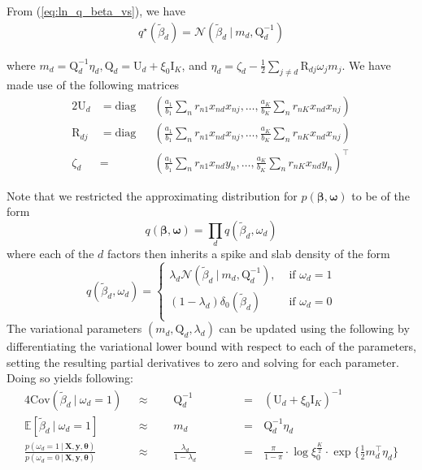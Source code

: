 \documentclass[twoside,11pt]{article}
\newcommand\given[1][]{\:#1\vert\:}
\newcommand{\transpose}[1]{#1^{\intercal}}
\newcommand{\nsum}{\sum\limits_{n}}
\newcommand{\boldbeta}{\boldsymbol\beta}
\newcommand{\E}{\mathbb{E}}
\newcommand{\betad}{\tilde{\beta}_d}
\newcommand{\umat}{\mathrm{U}}
\newcommand{\qmat}{\mathrm{Q}}
\newcommand{\pr}[1]{p \left( #1 \right)}
\begin{document}
From (\ref{eq:ln_q_beta_vs}), we have
\begin{align*}
	q^{\star}(\betad) = \mathcal{N} \left( \betad \given m_d, \qmat_d^{-1} \right)
\end{align*}

where $m_d = \qmat_d^{-1} \eta_d, \qmat_d = \umat_d + \xi_0 \mathrm{I}_K$, and $\eta_d = \zeta_d - \frac{1}{2} \sum\limits_{j \neq d} \mathrm{R}_{dj} \omega_j m_j$. We have made use of the following matrices
\begin{alignat}{2}
	\umat_d &= \mathrm{diag} &&\left(\frac{a_1}{b_1} \nsum r_{n1} x_{nd}x_{nj}, \ldots, \frac{a_K}{b_K} \nsum r_{nK} x_{nd}x_{nj} \right) \\
	\mathrm{R}_{dj} &= \mathrm{diag} &&\left(\frac{a_1}{b_1} \nsum r_{n1} x_{nd}x_{nj}, \ldots, \frac{a_K}{b_K} \nsum r_{nK} x_{nd}x_{nj} \right) \\
	\zeta_d &= &&\transpose{\left( \frac{a_1}{b_1} \nsum r_{n1} x_{nd}y_{n}, \ldots, \frac{a_K}{b_K} \nsum r_{nK} x_{nd}y_{n} \right)}
\end{alignat}



Note that we restricted the approximating distribution for $\pr{\boldbeta, \boldsymbol\omega}$ to be of the form
$$ q \left( \boldbeta, \boldsymbol \omega\right) = \prod_{d} q \left( \betad, \omega_d \right) $$
where each of the $d$ factors then inherits a spike and slab density of the form
\[   
q \left( \betad, \omega_d \right) = 
\left\{
\begin{array}{ll}
      \lambda_d \mathcal{N} \left( \betad \given m_d, \qmat_d^{-1} \right),  & \textrm{ if } \omega_d = 1 \\
      (1 - \lambda_d) \delta_0 \left( \betad \right) & \textrm{ if } \omega_d = 0 \\
\end{array} 
\right. \]
The variational parameters $(m_d, \qmat_d, \lambda_d)$ can be updated using the following by differentiating the variational lower bound with respect to each of the parameters, setting the resulting partial derivatives to zero and solving for each parameter. Doing so yields following:
\setlength{\jot}{10pt}
\begin{alignat}{4}
  \mathrm{Cov}(\betad \given \omega_d = 1) \textrm{ } &\approx \textrm{ }&& \qmat_d^{-1} &&\textrm{ } & &= \textrm{ } \left(\umat_d + \xi_0 \mathrm{I}_K\right)^{-1} \label{eq:var_betad}\\
  \E [ \betad \given \omega_d = 1]  \textrm{ }&\approx \textrm{ } && m_d &&\textrm{ }& &= \textrm{ } \qmat_d^{-1} \eta_d  \label{eq:e_betad}\\
  \frac{\pr{\omega_d = 1\given \mathbf{X}, \mathbf{y}, \boldsymbol\theta}}{\pr{\omega_d = 0 \given \mathbf{X}, \mathbf{y}, \boldsymbol\theta}} \textrm{ } &\approx \textrm{ } && \frac{\lambda_d}{1-\lambda_d}&& \textrm{ }& &= \textrm{ } \frac{\pi}{1-\pi} \cdot \log \xi_0^{\frac{K}{2}} \cdot \exp\Big\{\frac{1}{2}\transpose{m_d}\eta_d\Big\} \label{eq:logodds_lambda}
\end{alignat}
\end{document}
